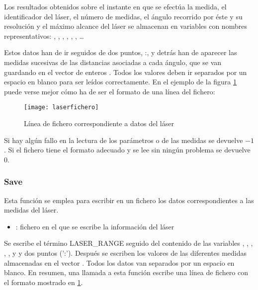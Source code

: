 \noindent
Los resultados obtenidos sobre el instante en que se efectúa la medida, el identificador del láser, el número de medidas, el ángulo recorrido por éste y su resolución y el máximo alcance del láser se almacenan en variables con nombres representativos: , , , , , , \ldots

Estos datos han de ir seguidos de dos puntos, :, y detrás han de aparecer las medidas sucesivas de las distancias asociadas a cada ángulo, que se van guardando en el vector de enteros . Todos los valores deben ir separados por un espacio en blanco para ser leídos correctamente. En el ejemplo de la figura \ref{fg:ficherolaser} puede verse mejor cómo ha de ser el formato de una línea del fichero:

\begin{figure}[h]
  \centering\texttt{[image: laserfichero]}\\
  \caption{Línea de fichero correspondiente a datos del láser}\label{fg:ficherolaser}
\end{figure}

\noindent
Si hay algún fallo en la lectura de los parámetros o de las medidas se devuelve $-1$. Si el fichero tiene el formato adecuado y se lee sin ningún problema se devuelve $0$.

\subsubsection{Save}


\noindent
Esta función se emplea para escribir en un fichero los datos correspondientes a las medidas del láser.

\begin{itemize}
  \item {}: fichero en el que se escribe la información del láser
\end{itemize}

\noindent
Se escribe el término LASER\_RANGE seguido del contenido de las variables , , , , ,  y  y dos puntos (':'). Después se escriben los valores de las diferentes medidas almacenadas en el vector . Todos los datos van separados por un espacio en blanco. En resumen, una llamada a esta función escribe una línea de fichero con el formato mostrado en \ref{fg:ficherolaser}.


